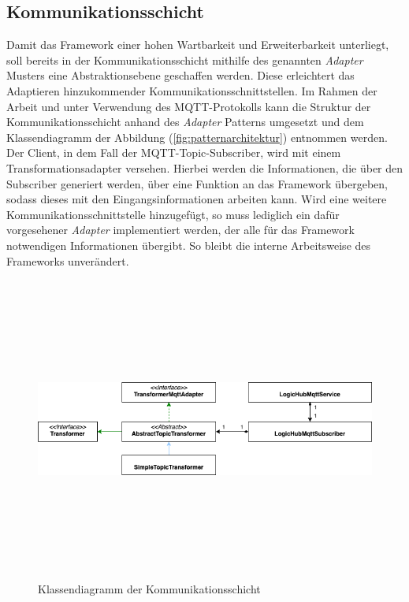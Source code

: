     \subsection{Kommunikationsschicht}
    Damit das Framework einer hohen Wartbarkeit und Erweiterbarkeit unterliegt, soll bereits in der Kommunikationsschicht mithilfe 
    des genannten \textit{Adapter} Musters eine Abstraktionsebene geschaffen werden. Diese erleichtert das Adaptieren 
    hinzukommender Kommunikationsschnittstellen. Im Rahmen der Arbeit und unter Verwendung des \acs{MQTT}-Protokolls kann die 
    Struktur der Kommunikationsschicht anhand des \textit{Adapter} Patterns umgesetzt und dem Klassendiagramm der Abbildung (\ref{fig:patternarchitektur}) entnommen werden. 
    Der Client, in dem Fall der \acs{MQTT}-Topic-Subscriber, wird mit einem Transformationsadapter versehen. Hierbei werden die 
    Informationen, die über den Subscriber generiert werden, über eine Funktion an das Framework übergeben, sodass dieses mit den Eingangsinformationen arbeiten kann. 
    Wird eine weitere Kommunikationsschnittstelle hinzugefügt, so muss lediglich ein dafür vorgesehener \textit{Adapter} implementiert werden, der 
    alle für das Framework notwendigen Informationen übergibt. So bleibt die interne Arbeitsweise des Frameworks unverändert.
    \begin{figure}[hbt!]
        \centering
        \includegraphics[width=14cm,height=10cm,keepaspectratio]{images/Kommunikationsschicht_final.png}
        \caption{Klassendiagramm der Kommunikationsschicht}
        \label{fig:patternkommunikation}
    \end{figure}
    \pagebreak
